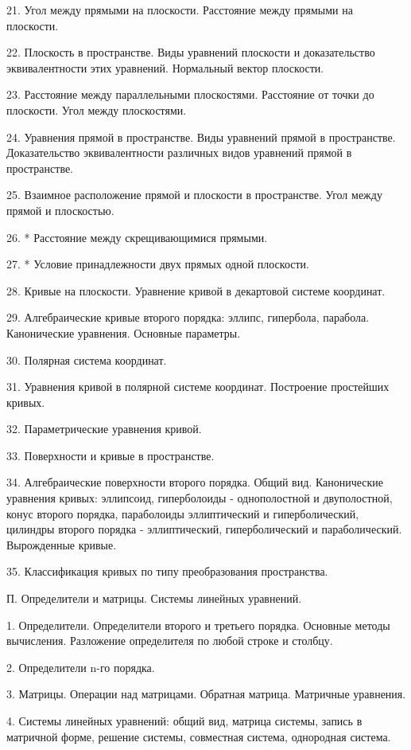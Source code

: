 \documentclass[a4paper]{article}
\begin{document}
    21. Угол между прямыми на плоскости. Расстояние между прямыми на плоскости.

    22. Плоскость в пространстве. Виды уравнений плоскости и доказательство эквивалентности этих уравнений. Нормальный вектор плоскости.

    23. Расстояние между параллельными плоскостями. Расстояние от точки до плоскости. Угол между плоскостями.

    24. Уравнения прямой в пространстве. Виды уравнений прямой в пространстве. Доказательство эквивалентности различных видов уравнений прямой в пространстве.

    25. Взаимное расположение прямой и плоскости в пространстве. Угол между прямой и плоскостью.

    26. * Расстояние между скрещивающимися прямыми.

    27. * Условие принадлежности двух прямых одной плоскости.

    28. Кривые на плоскости. Уравнение кривой в декартовой системе координат.

    29. Алгебраические кривые второго порядка: эллипс, гипербола, парабола. Канонические уравнения. Основные параметры.

    30. Полярная система координат.

    31. Уравнения кривой в полярной системе координат. Построение простейших кривых.

    32. Параметрические уравнения кривой.

    33. Поверхности и кривые в пространстве.

    34. Алгебраические поверхности второго порядка. Общий вид. Канонические уравнения кривых: эллипсоид, гиперболоиды - однополостной и двуполостной, конус второго порядка, параболоиды эллиптический и гиперболический, цилиндры второго порядка - эллиптический, гиперболический и параболический. Вырожденные кривые.

    35. Классификация кривых по типу преобразования пространства.

    П. Определители и матрицы. Системы линейных уравнений.

    1. Определители. Определители второго и третьего порядка. Основные методы вычисления. Разложение определителя по любой строке и столбцу.

    2. Определители n-го порядка.

    3. Матрицы. Операции над матрицами. Обратная матрица. Матричные уравнения.

    4. Системы линейных уравнений: общий вид, матрица системы, запись в матричной форме, решение системы, совместная система, однородная система.
\end{document}
